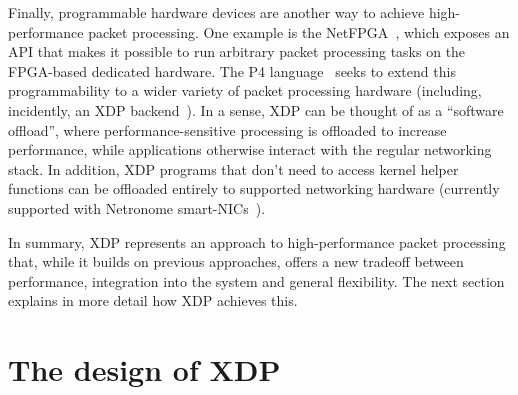 \documentclass[sigconf]{acmart}
\begin{document}
Finally, programmable hardware devices are another way to achieve
high-performance packet processing. One example is the
NetFPGA~\cite{lockwood2007netfpga}, which exposes an API that makes it possible
to run arbitrary packet processing tasks on the FPGA-based dedicated hardware.
The P4 language~\cite{bosshart2014p4} seeks to extend this programmability to a
wider variety of packet processing hardware (including, incidently, an XDP
backend~\cite{p4xdp}). In a sense, XDP can be thought of as a ``software
offload'', where performance-sensitive processing is offloaded to increase
performance, while applications otherwise interact with the regular networking
stack. In addition, XDP programs that don't need to access kernel helper
functions can be offloaded entirely to supported networking hardware (currently
supported with Netronome smart-NICs~\cite{xdp-offload}).

In summary, XDP represents an approach to high-performance packet processing
that, while it builds on previous approaches, offers a new tradeoff between
performance, integration into the system and general flexibility. The next
section explains in more detail how XDP achieves this.

\section{The design of XDP}
\label{sec:design}
\end{document}

